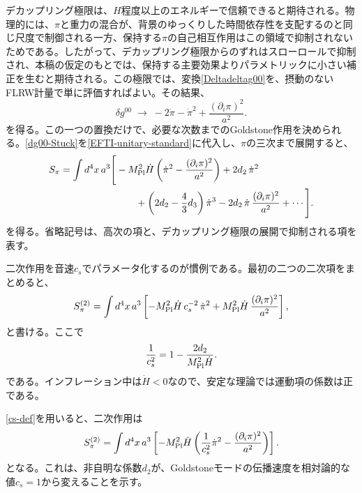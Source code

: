 \documentclass[a4paper,11pt,oneside]{article}
\theoremstyle{definition}
\numberwithin{equation}{section}
\begin{document}
デカップリング極限は、\(H\)程度以上のエネルギーで信頼できると期待される。物理的には、\(\pi\)と重力の混合が、背景のゆっくりした時間依存性を支配するのと同じ尺度で制御される一方、保持する\(\pi\)の自己相互作用はこの領域で抑制されないためである。したがって、デカップリング極限からのずれはスローロールで抑制され、本稿の仮定のもとでは、保持する主要効果よりパラメトリックに小さい補正を生むと期待される。この極限では、変換\eqref{Deltadeltag00}を、摂動のないFLRW計量で単に評価すればよい。その結果、
\begin{equation}\label{dg00-Stuck}
\delta g^{00}
\;\to\;
-2\dot\pi-\dot\pi^2+\frac{(\partial_i\pi)^2}{a^2} .
\end{equation}
を得る。この一つの置換だけで、必要な次数までのGoldstone作用を決められる。\eqref{dg00-Stuck}を\eqref{EFTI-unitary-standard}に代入し、\(\pi\)の三次まで展開すると、
\begin{align}\label{goal}
S_\pi
=
\int d^4x\,a^3
\Bigg[
&-M_{\rm Pl}^2\dot H
\left(
\dot\pi^2-\frac{(\partial_i\pi)^2}{a^2}
\right)
+2d_2\,\dot\pi^2
\nonumber\\
&\qquad
+\left(2d_2-\frac{4}{3}d_3\right)\dot\pi^3
-2d_2\,\dot\pi\,\frac{(\partial_i\pi)^2}{a^2}
+\cdots
\Bigg] .
\end{align}
を得る。省略記号は、高次の項と、デカップリング極限の展開で抑制される項を表す。



二次作用を音速\(c_s\)でパラメータ化するのが慣例である。最初の二つの二次項をまとめると、
\begin{equation}
S_\pi^{(2)}
=
\int d^4x\,a^3
\left[
-M_{\rm Pl}^2\dot H\,c_s^{-2}\,\dot\pi^2
+M_{\rm Pl}^2\dot H\,\frac{(\partial_i\pi)^2}{a^2}
\right] ,
\end{equation}
と書ける。ここで
\begin{equation}\label{cs-def}
\frac{1}{c_s^2}
=
1-\frac{2d_2}{M_{\rm Pl}^2\dot H} .
\end{equation}
である。インフレーション中は\(\dot H<0\)なので、安定な理論では運動項の係数は正である。



\eqref{cs-def}を用いると、二次作用は
\begin{equation}
S_\pi^{(2)}
=
\int d^4x\,a^3
\left[
-M_{\rm Pl}^2\dot H
\left(
\frac{1}{c_s^2}\dot\pi^2-\frac{(\partial_i\pi)^2}{a^2}
\right)
\right] .
\end{equation}
となる。これは、非自明な係数\(d_2\)が、Goldstoneモードの伝播速度を相対論的な値\(c_s=1\)から変えることを示す。
\end{document}
